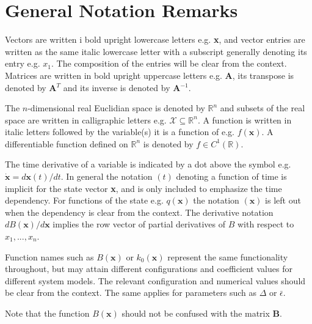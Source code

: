 \vspace{-0.2cm}
\section*{General Notation Remarks}
\vspace{-0.2cm}

Vectors are written i bold upright lowercase letters e.g. \textbf{x}, and vector entries are written as the same italic lowercase letter with a subscript generally denoting its entry e.g. $x_1$. The composition of the entries will be clear from the context.
Matrices are written in bold upright uppercase letters e.g. \textbf{A}, its transpose is denoted by \textbf{A}$^T$ and its inverse  is denoted by \textbf{A}$^{-1}$.

The $n$-dimensional real Euclidian space is denoted by $\mathbb{R}^n$ and subsets of the real space are written in calligraphic letters e.g. $\mathcal{X}\subseteq \mathbb{R}^n$. 
A function is written in italic letters followed by the variable(s) it is a function of e.g. $f(\mathbf{x})$. A differentiable function defined on $\mathbb{R}^n$ is denoted by $f\in C^1(\mathbb{R})$.

The time derivative of a variable is indicated by a dot above the symbol e.g. $\dot{\mathbf{x}} = d\mathbf{x}(t)/dt$. In general the notation $(t)$ denoting a function of time is implicit for the state vector \textbf{x}, and is only included to emphasize the time dependency. For functions of the state e.g. $q(\mathbf{x})$  the notation $(\mathbf{x})$ is left out when the dependency is clear from the context. The derivative notation $dB(\mathbf{x})/d\mathbf{x}$ implies the row vector of partial derivatives of $B$ with respect to $x_1,...,x_n$. 

Function names such as $B(\mathbf{x})$ or $k_0(\mathbf{x})$ represent the same functionality throughout, but may attain different configurations and  coefficient values for different system models. The relevant configuration and numerical values should be clear from the context. The same applies for parameters such as $\Delta$ or $\bar{\epsilon}$.

Note that the function $B(\mathbf{x})$ should not be confused with the matrix \textbf{B}.